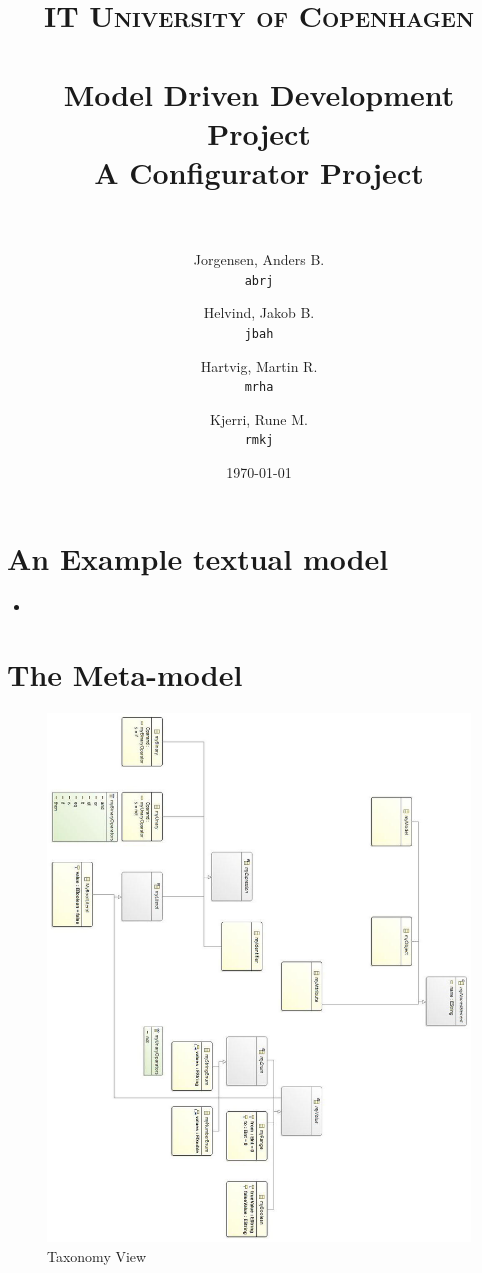 \documentclass[paper=a4, fontsize=11pt]{scrartcl} %
\title{	
\normalfont \normalsize 
\textsc{IT University of Copenhagen} \\ [25pt] %
\horrule{0.5pt} \\[0.4cm] %
\huge Model Driven Development Project \\ %
\large A Configurator Project \\ %
\horrule{2pt} \\[0.5cm] %
}
\author{
  Jorgensen, Anders B.\\
  \texttt{abrj}
  \and
  Helvind, Jakob B.\\
  \texttt{jbah}
  \and
  Hartvig, Martin R.\\
  \texttt{mrha}
  \and
  Kjerri, Rune M.\\
  \texttt{rmkj}
}
\date{\normalsize\today} %
\numberwithin{equation}{section} %
\numberwithin{figure}{section} %
\numberwithin{table}{section} %
\newcommand{\java}[2]{
\begin{itemize}
\item[]
\end{itemize}
}
\begin{document}
\maketitle %
\newpage


\section{An Example textual model}
\java{../configproject/runtime-CarFactory/src/factory.smdpdsl}{Concrete syntax of a CarFactory}

\section{The Meta-model}
\begin{figure}[H]
\centering
\includegraphics[scale=0.6]{pictures/taxView.jpg}
\caption{Taxonomy View}
\end{figure}
\end{document}
